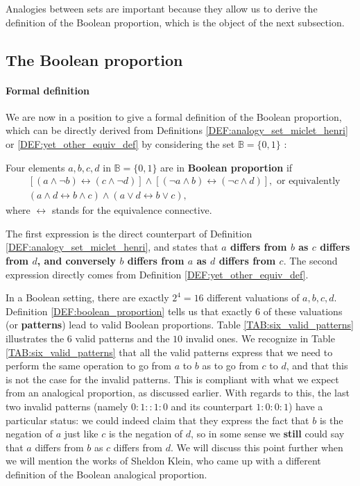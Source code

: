 Analogies between sets are important because they allow us to derive the
definition of the Boolean proportion, which is the object of the next
subsection.

\subsection{The Boolean proportion}
\label{SEC:boolean_prop}

\paragraph{Formal definition\\}

We are now in a position to give a formal definition of the Boolean proportion,
which can be directly derived from Definitions
\ref{DEF:analogy_set_miclet_henri} or \ref{DEF:yet_other_equiv_def} by
considering the set $\mathbb{B} = \{0, 1\}$ \cite{MicPra09}:

\begin{definition}
  \label{DEF:boolean_proportion}
  Four elements $a, b, c, d$ in $\mathbb{B} = \{0, 1\}$ are in \textbf{Boolean
  proportion} if
  \begin{align*}
    &\left[(a \wedge \neg b) \leftrightarrow (c \wedge \neg d)\right]  \wedge
    \left[(\neg a \wedge b)\leftrightarrow (\neg c \wedge d)\right], \text{ or equivalently}\\
    &  (a \wedge d \leftrightarrow b \wedge c) \wedge (a \vee  d
    \leftrightarrow b \vee c),
  \end{align*}
  where $\leftrightarrow$ stands for the equivalence connective.
\end{definition}

The first expression is the direct counterpart of Definition
\ref{DEF:analogy_set_miclet_henri}, and states that \textbf{$a$ differs from
$b$ as $c$ differs from $d$, and conversely $b$ differs from $a$ as $d$ differs
from $c$}.  The second expression directly comes from Definition
\ref{DEF:yet_other_equiv_def}.

In a Boolean setting, there are exactly $2^4 = 16$ different valuations of $a,
b, c, d$. Definition \ref{DEF:boolean_proportion} tells us that exactly $6$ of
these valuations (or \textbf{patterns}) lead to valid Boolean proportions.
Table \ref{TAB:six_valid_patterns} illustrates the $6$ valid patterns and the
$10$ invalid ones. We recognize in Table \ref{TAB:six_valid_patterns} that all
the valid patterns express that we need to perform the same operation to go
from $a$ to $b$ as to go from $c$ to $d$, and that this is not the case for the
invalid patterns. This is compliant with what we expect from an analogical
proportion, as discussed earlier. With regards to this, the last two invalid
patterns (namely $0:1::1:0$ and its counterpart $1:0:0:1$) have a particular
status: we could indeed claim that they express the fact that $b$ is the
negation of $a$ just like $c$ is the negation of $d$, so in some sense we
\textbf{still} could say that $a$ differs from $b$ as $c$ differs from $d$. We
will discuss this point further when we will mention the works of Sheldon
Klein, who came up with a different definition of the Boolean analogical
proportion.

